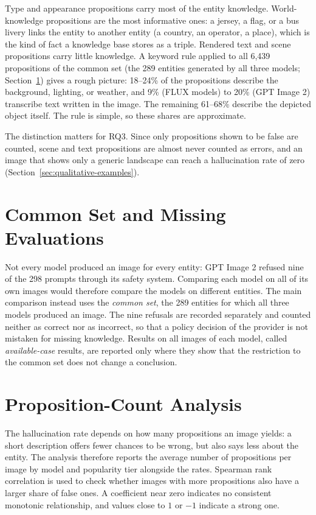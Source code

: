 Type and appearance propositions carry most of the entity knowledge.
World-knowledge propositions are the most informative ones: a jersey, a flag,
or a bus livery links the entity to another entity (a country, an operator, a
place), which is the kind of fact a knowledge base stores as a triple. Rendered
text and scene propositions carry little knowledge. A keyword rule applied to
all 6{,}439 propositions of the common set (the 289 entities generated by all
three models; Section~\ref{sec:fair-comparison}) gives a rough picture: 18--24\% of
the propositions describe the background, lighting, or weather, and 9\% (FLUX
models) to 20\% (GPT Image 2) transcribe text written in the image. The
remaining 61--68\% describe the depicted object itself. The rule is simple, so
these shares are approximate.

The distinction matters for RQ3. Since only propositions shown to be false are
counted, scene and text propositions are almost never counted as errors, and an
image that shows only a generic landscape can reach a hallucination rate of
zero (Section~\ref{sec:qualitative-examples}).

\section{Common Set and Missing Evaluations}
\label{sec:fair-comparison}

Not every model produced an image for every entity: GPT Image 2 refused nine of
the 298 prompts through its safety system. Comparing each model on all of its
own images would therefore compare the models on different entities. The main
comparison instead uses the \emph{common set}, the 289 entities for which all
three models produced an image. The nine refusals are recorded separately and
counted neither as correct nor as incorrect, so that a policy decision of the
provider is not mistaken for missing knowledge. Results on all images of each
model, called \emph{available-case} results, are reported only where they show
that the restriction to the common set does not change a conclusion.


\section{Proposition-Count Analysis}
\label{sec:fact-count}

The hallucination rate depends on how many propositions an image yields: a
short description offers fewer chances to be wrong, but also says less about
the entity. The analysis therefore reports the average number of propositions
per image by model and popularity tier alongside the rates. Spearman rank
correlation is used to check whether images with more propositions also have a
larger share of false ones. A coefficient near zero indicates no consistent
monotonic relationship, and values close to $1$ or $-1$ indicate a strong
one.


